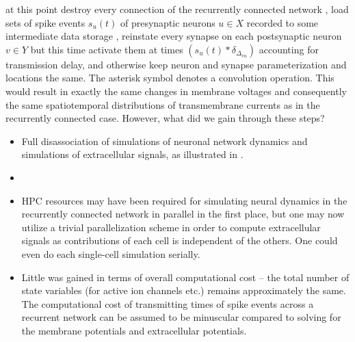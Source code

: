 at this point destroy every connection of the recurrently connected network ,
load sets of spike events $s_u(t)$ of presynaptic neurons $u \in X$ recorded to some intermediate data storage  ,
reinstate every synapse on each postsynaptic neuron $v \in Y$ but this time activate them at times
$\left(s_u(t) \ast \delta_{\Delta_{vu}}\right)$
accounting for transmission delay,
and otherwise keep neuron and synapse parameterization and locations the same.
The asterisk symbol denotes a convolution operation.
This would result in exactly the same changes in membrane voltages and consequently the same spatiotemporal distributions of transmembrane currents as in the recurrently connected case. 
However, what did we gain through these steps?

\begin{itemize}
\item Full disassociation of simulations of neuronal network dynamics and simulations of extracellular signals,
as illustrated in .
\item {}
\item HPC resources may have been required for simulating neural dynamics in the recurrently connected network in parallel in the first place,
but one may now utilize a trivial parallelization scheme in order to compute extracellular signals as contributions of each cell is independent of the others.
One could even do each single-cell simulation serially.
\item Little was gained in terms of overall computational cost -- the total number of state variables (for active ion channels etc.) remains approximately the same.
The computational cost of transmitting times of spike events across a recurrent network can be assumed to be minuscular compared to solving for the membrane potentials and extracellular potentials.
\end{itemize}

